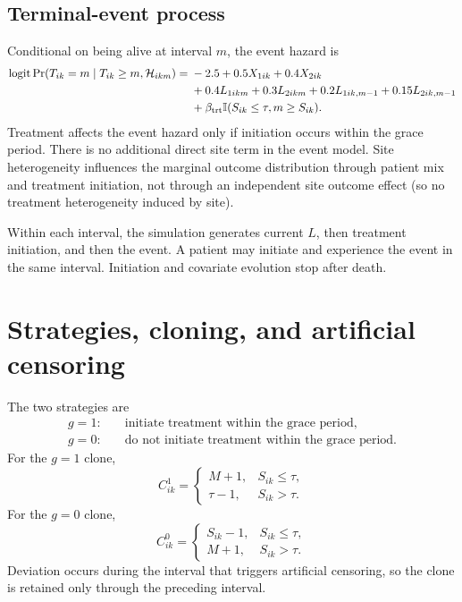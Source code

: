 \documentclass[11pt]{article}
\newcommand{\ind}{\mathbb{I}}
\newcommand{\Prb}{\operatorname{Pr}}
\begin{document}
\subsection{Terminal-event process}

Conditional on being alive at interval $m$, the event hazard is
\begin{align}
\label{eq:event-dgp}
  \operatorname{logit}
  \Prb(T_{ik}=m\mid T_{ik}\geq m,\mathcal H_{ikm})
  ={}&-2.5+0.5X_{1ik}+0.4X_{2ik} \notag\\
     &+0.4L_{1ikm}+0.3L_{2ikm}
      +0.2L_{1ik,m-1}+0.15L_{2ik,m-1} \notag\\
     &+\beta_{\mathrm{trt}}
       \ind(S_{ik}\leq\tau,m\geq S_{ik}).
\end{align}
Treatment affects the event hazard only if initiation occurs within the grace period. 
There is no additional direct site term in the event model. 
Site heterogeneity influences the marginal outcome distribution through patient mix and treatment initiation, 
not through an independent site outcome effect (so no treatment heterogeneity induced by site).

\medskip

Within each interval, the simulation generates current $L$, then treatment
initiation, and then the event. A patient may initiate and experience the event
in the same interval. Initiation and covariate evolution stop after death.

\section{Strategies, cloning, and artificial censoring}

The two strategies are
\begin{align*}
  g=1:&\quad \text{initiate treatment within the grace period},\\
  g=0:&\quad \text{do not initiate treatment within the grace period}.
\end{align*}
For the $g=1$ clone,
\[
  C^1_{ik}
  =\begin{cases}
      M+1, & S_{ik}\leq\tau,\\
      \tau-1, & S_{ik}>\tau.
    \end{cases}
\]
For the $g=0$ clone,
\[
  C^0_{ik}
  =\begin{cases}
      S_{ik}-1, & S_{ik}\leq\tau,\\
      M+1, & S_{ik}>\tau.
    \end{cases}
\]
Deviation occurs during the interval that triggers artificial censoring, so
the clone is retained only through the preceding interval.
\end{document}
